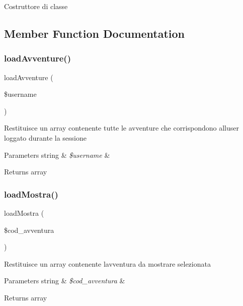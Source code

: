 Costruttore di classe 

\subsection{Member Function Documentation}
\mbox{\label{class_f_avventura_af0d1851adb6a197e257708a29576d5a1}} 
\subsubsection{\texorpdfstring{load\+Avventure()}{loadAvventure()}}
{\footnotesize\ttfamily load\+Avventure (\begin{DoxyParamCaption}\item[{}]{\$username }\end{DoxyParamCaption})}

Restituisce un array contenente tutte le avventure che corrispondono all\textquotesingle{}user loggato durante la sessione


\begin{DoxyParams}[1]{Parameters}
string & {\em \$username} & \\
\hline
\end{DoxyParams}
\begin{DoxyReturn}{Returns}
array 
\end{DoxyReturn}
\mbox{\label{class_f_avventura_ac86f7880e6e8e228f0559680fbd165b1}} 
\subsubsection{\texorpdfstring{load\+Mostra()}{loadMostra()}}
{\footnotesize\ttfamily load\+Mostra (\begin{DoxyParamCaption}\item[{}]{\$cod\+\_\+avventura }\end{DoxyParamCaption})}

Restituisce un array contenente l\textquotesingle{}avventura da mostrare selezionata


\begin{DoxyParams}[1]{Parameters}
string & {\em \$cod\+\_\+avventura} & \\
\hline
\end{DoxyParams}
\begin{DoxyReturn}{Returns}
array 
\end{DoxyReturn}
\mbox{\label{class_f_avventura_ac2694a7dd3ef55896292c94037bad8b7}} 
